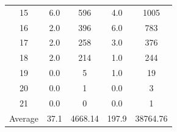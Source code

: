 \documentclass{article}
\begin{document}
\begin{table}[H]
\begin{tabular}{c c c c c}
        15      & 6.0                              & 596                                 & 4.0   & 1005     \\
        16      & 2.0                              & 396                                 & 6.0   & 783      \\
        17      & 2.0                              & 258                                 & 3.0   & 376      \\
        18      & 2.0                              & 214                                 & 1.0   & 244      \\
        19      & 0.0                              & 5                                   & 1.0   & 19       \\
        20      & 0.0                              & 1                                   & 0.0   & 3        \\
        21      & 0.0                              & 0                                   & 0.0   & 1        \\
        \midrule
        Average & 37.1                             & 4668.14                             & 197.9 & 38764.76 \\
        \bottomrule
    \end{tabular}
\end{table}
\end{document}
